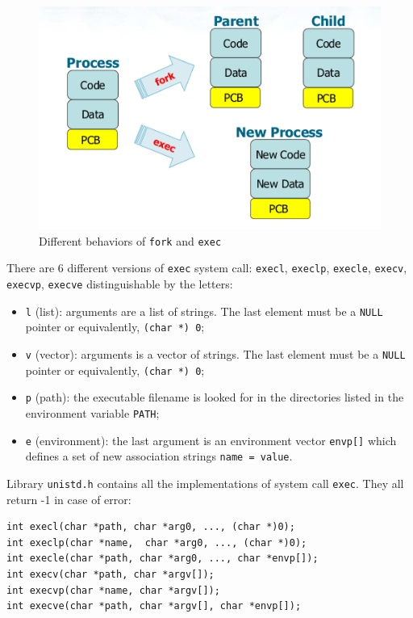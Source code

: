 \begin{figure}[hbtp]
\centering
\includegraphics[scale=0.4]{images/processes_concurrency/fork_exec.png}
\caption{Different behaviors of \texttt{fork} and \texttt{exec}}
\end{figure}

There are 6 different versions of \texttt{exec} system call: \texttt{execl}, \texttt{execlp}, \texttt{execle}, \texttt{execv}, \texttt{execvp}, \texttt{execve} distinguishable by the letters:
\begin{itemize}
\item \texttt{l} (list): arguments are a list of strings. The last element must be a \texttt{NULL} pointer or equivalently, \texttt{(char *) 0};
\item \texttt{v} (vector): arguments is a vector of strings. The last element must be a \texttt{NULL} pointer or equivalently, \texttt{(char *) 0};
\item \texttt{p} (path): the executable filename is looked for in the directories listed in the environment variable \texttt{PATH};
\item \texttt{e} (environment): the last argument is an environment vector \texttt{envp[]} which defines a set of new association strings \texttt{name = value}.
\end{itemize}

Library \texttt{unistd.h} contains all the implementations of system call \texttt{exec}. They all return -1 in case of error:
\begin{verbatim}
int execl(char *path, char *arg0, ..., (char *)0);
int execlp(char *name,  char *arg0, ..., (char *)0);
int execle(char *path, char *arg0, ..., char *envp[]);
int execv(char *path, char *argv[]);
int execvp(char *name, char *argv[]);
int execve(char *path, char *argv[], char *envp[]);
\end{verbatim}

